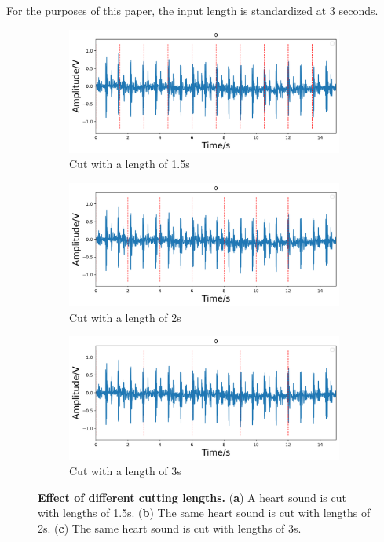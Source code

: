 For the purposes of this paper, the input length is standardized at 3 seconds.
\begin{figure}[!h]
\centering
    \begin{subfigure}{.85\linewidth}
        \centering
        \includegraphics[width=1\linewidth]{figs/disscussion/1.5s.png}
        \caption{Cut with a length of 1.5s}
        \label{FIG:length.a}
    \end{subfigure}\vfill
    \begin{subfigure}{.85\linewidth}
        \centering
        \includegraphics[width=1\linewidth]{figs/disscussion/2s.png}
        \caption{Cut with a length of 2s}
        \label{FIG:length.b}
    \end{subfigure}\vfill
    \begin{subfigure}{.85\linewidth}
        \centering
        \includegraphics[width=1\linewidth]{figs/disscussion/3s.png}
        \caption{Cut with a length of 3s}
        \label{FIG:length.c}
    \end{subfigure}
\caption{\textbf{Effect of different cutting lengths.} (\textbf{a}) A heart sound is cut with lengths of 1.5s. (\textbf{b}) The same heart sound is cut with lengths of 2s. (\textbf{c}) The same heart sound is cut with lengths of 3s.}
\label{FIG:length}
\end{figure}
